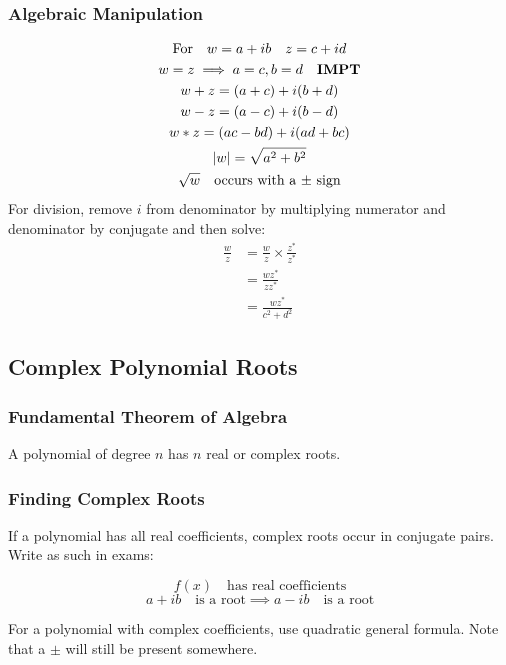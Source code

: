 \documentclass[../main]{subfiles}
\begin{document}
	\subsubsection{Algebraic Manipulation}  
	\begin{equation*} \begin{gathered}
		\text{For} \quad w = a+ib \quad z = c+id \\
		w = z \implies a = c, b = d \quad \text{\bf{IMPT}} \\
		w + z = (a+c) + i(b+d) \\
		w - z = (a-c) + i(b-d) \\
		w * z = (ac-bd) + i(ad+bc) \\
		|w| = \sqrt{a^2+b^2} \\
		\sqrt{w} \quad \text{occurs with a \(\pm\) sign}
	\end{gathered} \end{equation*}
	For division, remove \(i\) from denominator by multiplying numerator and denominator by conjugate and then solve:
	\begin{equation*} \begin{split}
		\frac{w}{z} & = \frac{w}{z} \times \frac{z^*}{z^*} \\
					& = \frac{wz^*}{zz^*} \\
					& = \frac{wz^*}{c^2+d^2}
	\end{split} \end{equation*}

\subsection{Complex Polynomial Roots}
	
	\subsubsection{Fundamental Theorem of Algebra}
	A polynomial of degree \(n\) has \(n\) real or complex roots. 

	\subsubsection{Finding Complex Roots}
	If a polynomial has all real coefficients, complex roots occur in conjugate pairs. Write as such in exams:
	
	\[ f(x) \quad \text{has real coefficients} \]
	\[ a+ib \quad \text{is a root} \implies a-ib \quad \text{is a root} \] 

	For a polynomial with complex coefficients, use quadratic general formula. Note that a \(\pm\) will still be present somewhere.
\end{document}
